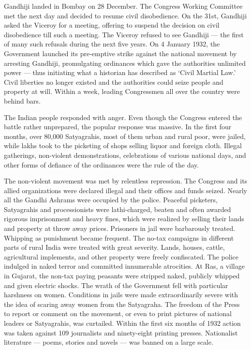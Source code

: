 \begin{multicols}{2}
Gandhiji landed in Bombay on 28 December. The Congress Working Committee met the next day and decided to resume civil disobedience. On the 31st, Gandhiji asked the Viceroy for a meeting, offering to suspend the decision on civil disobedience till such a meeting. The Viceroy refused to see Gandhiji --- the first of many such refusals during the next five years. On 4 January 1932, the Government launched its pre-emptive strike against the national movement by arresting Gandhiji, promulgating ordinances which gave the authorities unlimited power --- thus initiating what a historian has described as `Civil Martial Law.' Civil liberties no longer existed and the authorities could seize people and property at will. Within a week, leading Congressmen all over the country were behind bars.

The Indian people responded with anger. Even though the Congress entered the battle rather unprepared, the popular response was massive. In the first four months, over 80,000 Satyagrahis, most of them urban and rural poor, were jailed, while lakhs took to the picketing of shops selling liquor and foreign cloth. Illegal gatherings, non-violent demonstrations, celebrations of various national days, and other forms of defiance of the ordinances were the rule of the day.

The non-violent movement was met by relentless repression. The Congress and its allied organizations were declared illegal and their offices and funds seized. Nearly all the Gandhi Ashrams were occupied by the police. Peaceful picketers, Satyagrahis and processionists were lathi-charged, beaten and often awarded rigorous imprisonment and heavy fines, which were realized by selling their lands and property at throw away prices. Prisoners in jail were barbarously treated. Whipping as punishment became frequent. The no-tax campaigns in different parts of rural India were treated with great severity. Lands, houses, cattle, agricultural implements, and other property were freely confiscated. The police indulged in naked terror and committed innumerable atrocities. At Ras, a village in Gujarat, the non-tax paying peasants were stripped naked, publicly whipped and given electric shocks. The wrath of the Government fell with particular harshness on women. Conditions in jails were made extraordinarily severe with the idea of scaring away women from the Satyagraha. The freedom of the Press to report or comment on the movement, or even to print pictures of national leaders or Satyagrahis, was curtailed. Within the first six months of 1932 action was taken against 109 journalists and ninety-eight printing presses. Nationalist literature --- poems, stories and novels --- was banned on a large scale.


\end{multicols}
